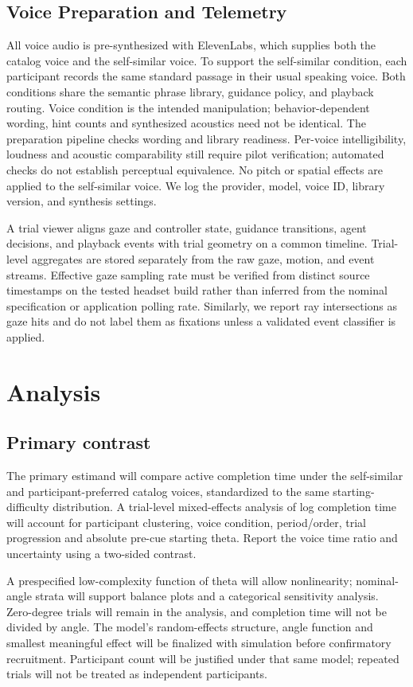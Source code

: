 \documentclass[11pt,letterpaper]{article}
\begin{document}
\subsection{Voice Preparation and Telemetry}
All voice audio is pre-synthesized with ElevenLabs, which supplies both the catalog voice and the self-similar voice. To support the self-similar condition, each participant records the same standard passage in their usual speaking voice. Both conditions share the semantic phrase library, guidance policy, and playback routing. Voice condition is the intended manipulation; behavior-dependent wording, hint counts and synthesized acoustics need not be identical. The preparation pipeline checks wording and library readiness. Per-voice intelligibility, loudness and acoustic comparability still require pilot verification; automated checks do not establish perceptual equivalence. No pitch or spatial effects are applied to the self-similar voice. We log the provider, model, voice ID, library version, and synthesis settings.

A trial viewer aligns gaze and controller state, guidance transitions, agent decisions, and playback events with trial geometry on a common timeline. Trial-level aggregates are stored separately from the raw gaze, motion, and event streams. Effective gaze sampling rate must be verified from distinct source timestamps on the tested headset build rather than inferred from the nominal specification or application polling rate. Similarly, we report ray intersections as gaze hits and do not label them as fixations unless a validated event classifier is applied.
\section{Analysis}
\subsection{Primary contrast}
The primary estimand will compare active completion time under the self-similar and participant-preferred catalog voices, standardized to the same starting-difficulty distribution. A trial-level mixed-effects analysis of log completion time will account for participant clustering, voice condition, period/order, trial progression and absolute pre-cue starting theta. Report the voice time ratio and uncertainty using a two-sided contrast.

A prespecified low-complexity function of theta will allow nonlinearity; nominal-angle strata will support balance plots and a categorical sensitivity analysis. Zero-degree trials will remain in the analysis, and completion time will not be divided by angle. The model's random-effects structure, angle function and smallest meaningful effect will be finalized with simulation before confirmatory recruitment. Participant count will be justified under that same model; repeated trials will not be treated as independent participants.
\end{document}
